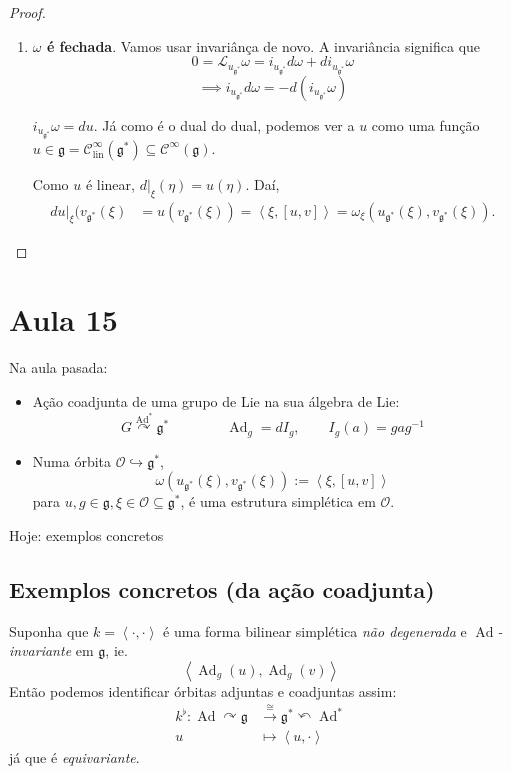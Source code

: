 \begin{proof}
\begin{enumerate}[label=\textbf{Paso \arabic*}]
\item \textbf{$\omega$ é fechada}. Vamos usar invariânça de novo. A invariância significa que
	\[0=\mathcal{L}_{u_{\mathfrak{g}^*}}\omega=i_{u_{\mathfrak{g}^*}}d\omega +di_{u_{\mathfrak{g}^*}}\omega\]
	\[\implies i_{u_{\mathfrak{g}^*}}d\omega =-d(i_{u_{\mathfrak{g}^*}}\omega )\]
	\begin{claim}
		$i_{u_{\mathfrak{g}^*}}\omega =du$. Já como é o dual do dual, podemos ver a $u$ como uma função $u\in\mathfrak{g} =\mathcal{C}^\infty_{\operatorname{lin}}(\mathfrak{g}^*)\subseteq \mathcal{C}^\infty(\mathfrak{g})$.
	\end{claim}
	Como $u$ é linear, $d|_{\xi}(\eta)=u(\eta)$. Daí,
	\begin{align*}
		du|_{\xi}(v_{\mathfrak{g}^*}(\xi )&=u(v_{\mathfrak{g}^*}(\xi ))=\left<\xi,[u,v]\right> =\omega_{\xi}(u_{\mathfrak{g}^*}(\xi ),v_{\mathfrak{g}^*}(\xi )).
	\end{align*}
	\end{enumerate}
\end{proof}

\section{Aula 15}

Na aula pasada:
\begin{itemize}
\item Ação coadjunta de uma grupo de Lie na sua álgebra de Lie:
	\[G\overset{\operatorname{Ad}^*}{\curvearrowright}\mathfrak{g}^*\qquad \qquad \operatorname{Ad}_{g}=d I_g,\qquad I_g(a)=gag^{-1}\]
\item Numa órbita $\mathcal{O}\hookrightarrow \mathfrak{g}^*$,
	\[\omega\left( u_{\mathfrak{g}^*}(\xi),v_{\mathfrak{g}^*}(\xi) \right) :=\left<\xi,[u,v]\right> \]
	para $u,g\in\mathfrak{g},\xi\in\mathcal{O}\subseteq \mathfrak{g}^*$, é uma estrutura simplética em $\mathcal{O}$.
\end{itemize}
Hoje: exemplos concretos

\subsection{Exemplos concretos (da ação coadjunta)}
\begin{remark}
	Suponha que $k=\left<\cdot,\cdot\right> $ é uma forma bilinear simplética \textit{não degenerada} e \textit{$\operatorname{Ad}$-invariante} em  $\mathfrak{g}$, ie.
	\[\left<\operatorname{Ad}_g(u),\operatorname{Ad}_g(v)\right> \]
	Então podemos identificar órbitas adjuntas e coadjuntas assim:
	\begin{align*}
		k^\flat: \operatorname{Ad}\curvearrowright \mathfrak{g} &\xrightarrow{\cong }\mathfrak{g}^*\curvearrowleft \operatorname{Ad}^*  \\
		u &\longmapsto \left<u,\cdot\right> 
	\end{align*}
	já que é \textit{equivariante}.
\end{remark}

